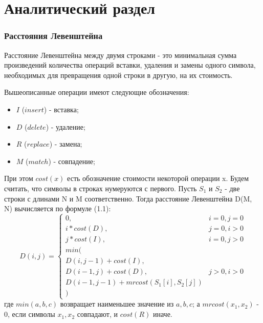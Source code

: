 \chapter{Аналитический раздел}
\label{cha:analysis}

\subsection{Расстояния Левенштейна}

Расстояние Левенштейна между двумя строками - это минимальная сумма произведений количества операций вставки, удаления и замены одного символа, необходимых для превращения одной строки в другую, на их стоимость.

Вышеописанные операции имеют следующие обозначения:
\begin{itemize}
    \item $I$ ($insert$) - вставка;
    \item $D$ ($delete$) - удаление;
    \item $R$ ($replace$) - замена;
    \item $M$ ($match$) - совпадение;
\end{itemize}

При этом $cost(x)$ есть обозначение стоимости некоторой операции x. Будем считать, что символы в строках нумеруются с первого. Пусть $S_{1}$ и $S_{2}$ - две строки с длинами N и M соответственно. Тогда расстояние Левенштейна D(M, N) вычисляется по формуле (1.1):
\begin{equation}
D(i,j) = \left\{ \begin{array}{ll}
 0, & \textrm{$i = 0, j = 0$}\\
 i * cost(D), & \textrm{$j = 0, i > 0$}\\
 j * cost(I), & \textrm{$i = 0, j > 0$}\\
min(\\
D(i,j-1) + cost(I),\\
D(i-1, j) + cost(D), &\textrm{$j > 0, i > 0$}\\
D(i-1, j-1) + mrcost(S_1[i], S_2[j])\\
)
  \end{array} \right.
\end{equation}
где $min(a, b, c)$ возвращает наименьшее значение из $a, b, c$; а $mrcost(x_1, x_2)$ - 0, если символы $x_1, x_2$ совпадают, и $cost(R)$ иначе.

